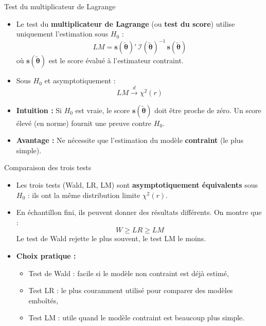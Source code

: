\documentclass[11pt,aspectratio=169]{beamer}
\begin{document}
\begin{frame}{Test du multiplicateur de Lagrange}

\begin{itemize}

\item Le test du \textbf{multiplicateur de Lagrange} (ou \textbf{test du score}) utilise uniquement l'estimation sous $H_0$ :
  \[
  LM = \mathbf{s}(\tilde{\bm{\theta}})'\,\mathcal{I}(\tilde{\bm{\theta}})^{-1}\,\mathbf{s}(\tilde{\bm{\theta}})
  \]
  où $\mathbf{s}(\tilde{\bm{\theta}})$ est le score évalué à l'estimateur contraint.\newline

\item Sous $H_0$ et asymptotiquement :
  \[
  LM \xrightarrow{d} \chi^2(r)
  \]\newline

\item \textbf{Intuition :} Si $H_0$ est vraie, le score $\mathbf{s}(\tilde{\bm{\theta}})$ doit être proche de zéro. Un score élevé (en norme) fournit une preuve contre $H_0$.\newline

\item \textbf{Avantage :} Ne nécessite que l'estimation du modèle \textbf{contraint} (le plus simple).

\end{itemize}

\end{frame}

\begin{frame}{Comparaison des trois tests}

\begin{itemize}

\item Les trois tests (Wald, LR, LM) sont \textbf{asymptotiquement équivalents} sous $H_0$ : ils ont la même distribution limite $\chi^2(r)$.\newline

\item En échantillon fini, ils peuvent donner des résultats différents. On montre que :
  \[
  W \geq LR \geq LM
  \]
  Le test de Wald rejette le plus souvent, le test LM le moins.\newline

\item \textbf{Choix pratique :}
  \begin{itemize}
  \item Test de Wald : facile si le modèle non contraint est déjà estimé,
  \item Test LR : le plus couramment utilisé pour comparer des modèles emboîtés,
  \item Test LM : utile quand le modèle contraint est beaucoup plus simple.
  \end{itemize}

\end{itemize}

\end{frame}
\end{document}
